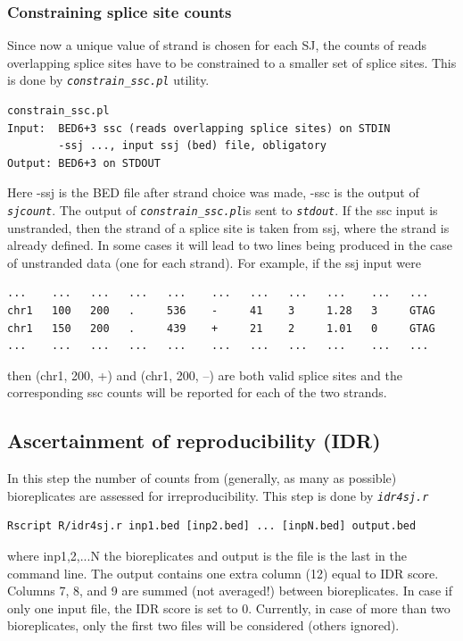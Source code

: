 \documentclass{article}
\newcommand{\prog}[1]{{\tt\em #1}}
\begin{document}
\subsubsection{Constraining splice site counts}
Since now a unique value of strand is chosen for each SJ, the counts of reads overlapping splice sites have to be constrained to a smaller set of splice sites.
This is done by \prog{constrain\_ssc.pl} utility.
\begin{verbatim}
constrain_ssc.pl
Input:  BED6+3 ssc (reads overlapping splice sites) on STDIN
        -ssj ..., input ssj (bed) file, obligatory
Output: BED6+3 on STDOUT
\end{verbatim}
Here -ssj is the BED file after strand choice was made, -ssc is the output of \prog{sjcount}. The output of \prog{constrain\_ssc.pl}is sent to \prog{stdout}. 
If the ssc input is unstranded, then the strand of a splice site is taken from ssj, where the strand is already defined. In some cases it will lead to two 
lines being produced in the case of unstranded data (one for each strand). For example, if the ssj input were
\begin{verbatim}
...    ...   ...   ...   ...    ...   ...   ...   ...    ...   ...
chr1   100   200   .     536    -     41    3     1.28   3     GTAG
chr1   150   200   .     439    +     21    2     1.01   0     GTAG
...    ...   ...   ...   ...    ...   ...   ...   ...    ...   ...
\end{verbatim}
then (chr1, 200, +) and (chr1, 200, --) are both valid splice sites and the corresponding ssc counts will be reported for each of the two strands.

\subsection{Ascertainment of reproducibility (IDR)}
In this step the number of counts from (generally, as many as possible) bioreplicates are assessed for irreproducibility. This step is done by \prog{idr4sj.r}
\begin{verbatim}
Rscript R/idr4sj.r inp1.bed [inp2.bed] ... [inpN.bed] output.bed
\end{verbatim}
where inp1,2,...N the bioreplicates and output is the file is the last in the command line. The output contains one extra column (12) equal to IDR score.
Columns 7, 8, and 9 are summed (not averaged!) between bioreplicates. 
In case if only one input file, the IDR score is set to 0. Currently, in case of more than two bioreplicates, only the first two files will be considered (others ignored).
\end{document}
